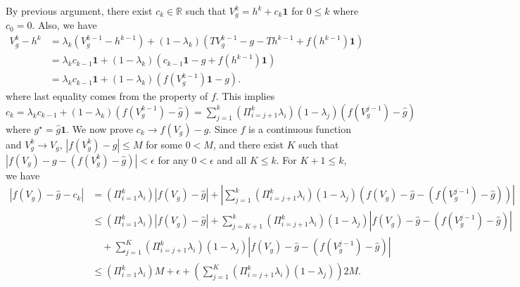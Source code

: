 \documentclass{article} %
\newcommand{\reals}{\mathbb{R}}
\newcommand{\abs}[1]{\left|{#1}\right|}
\newcommand*{\para}[1]{\left({#1}\right)}
\begin{document}
  By previous argument, there exist $c_k \in \reals$ such that $V_{g}^k =h^k+c_k \mathbf{1}$ for $ 0\le k$ where $c_0=0$. Also, we have 
  \begin{align*}
      V_{g}^k -h^k &=\lambda_k(V_{g}^{k-1} -h^{k-1}) +(1-\lambda_k)(TV^{k-1}_g-g-Th^{k-1}+f(h^{k-1})\mathbf{1})
      \\&   = \lambda_kc_{k-1}\mathbf{1}+(1-\lambda_k)(c_{k-1}\mathbf{1}-g+f(h^{k-1})\mathbf{1})
      \\&   = \lambda_kc_{k-1}\mathbf{1}+(1-\lambda_k)(f(V_g^{k-1})\mathbf{1}-g).
  \end{align*}
 where last equality comes from the property of $f$. This implies $ c_k = \lambda_kc_{k-1}+(1-\lambda_k)(f(V_{g}^{k-1})-\hat{g}) = \sum^{k}_{j=1} (\Pi^k_{i=j+1}\lambda_i) (1-\lambda_j)(f(V_{g}^{j-1})-\hat{g})$ where  $g^{\star}= \hat{g} \mathbf{1}$. We now prove $c_k \rightarrow f(V_{g})-\hat{g}$. Since $f$ is a continuous function and $V_g^k \rightarrow V_g$, $\abs{f(V^k_{g})-\hat{g}} \le M $ for some $0<M$, and there exist $K$ such that $ |f(V_{g})-g- (f(V^k_{g})-\hat{g})| <\epsilon$ for any $0<\epsilon$ and all $ K \le k$. For $K+1\le k$, we have
   \begin{align*}
      \abs{f(V_{g})-\hat{g}-c_k} &= \para{\Pi^k_{i=1}\lambda_i}\abs{f(V_{g})-\hat{g}}+\abs{\sum^{k}_{j=1} (\Pi^k_{i=j+1}\lambda_i) (1-\lambda_j)\para{f(V_{g})-\hat{g}-(f(V_{g}^{j-1})-\hat{g})}}
      \\& \le \para{\Pi^k_{i=1}\lambda_i}\abs{f(V_{g})-\hat{g}}+\sum^{k}_{j=K+1}(\Pi^k_{i=j+1}\lambda_i) (1-\lambda_j)\abs{f(V_{g})-\hat{g}-(f(V_{g}^{j-1})-\hat{g})}
      \\& \quad +\sum^{K}_{j=1}(\Pi^k_{i=j+1}\lambda_i) (1-\lambda_j)\abs{f(V_{g})-\hat{g}-(f(V_{g}^{j-1})-\hat{g})}
      \\& \le \para{\Pi^k_{i=1}\lambda_i}M+\epsilon+ \para{\sum^{K}_{j=1}(\Pi^k_{i=j+1}\lambda_i) (1-\lambda_j)}2M .
  \end{align*}
\end{document}
